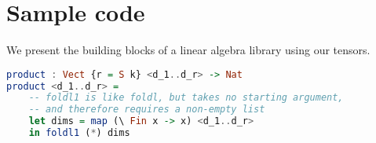 \documentclass[12pt]{article}
\begin{document}
\section{Sample code}
We present the building blocks of a linear algebra library using our tensors.
\begin{lstlisting}[language=Haskell]
product : Vect {r = S k} <d_1..d_r> -> Nat
product <d_1..d_r> =  
	-- foldl1 is like foldl, but takes no starting argument, 
	-- and therefore requires a non-empty list
	let dims = map (\ Fin x -> x) <d_1..d_r> 
	in foldl1 (*) dims
\end{lstlisting}
\end{document}
